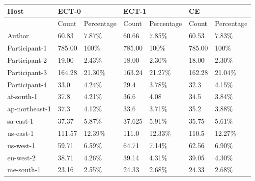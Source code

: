 \documentclass{l4proj}
\begin{document}
\begin{table}[H]
\begin{tabular}{|l|l|l|l|l|l|l|}
\hline
Host           & \multicolumn{2}{l|}{ECT-0} & \multicolumn{2}{l|}{ECT-1} & \multicolumn{2}{l|}{CE} \\ \hline
               & Count      & Percentage    & Count      & Percentage    & Count    & Percentage   \\ \hline
Author         & 60.83      & 7.87\%        & 60.66      & 7.85\%        & 60.53    & 7.83\%       \\ \hline
Participant-1  & 785.00     & 100\%         & 785.00     & 100\%         & 785.00   & 100\%        \\ \hline
Participant-2  & 19.00      & 2.43\%        & 18.00      & 2.30\%        & 18.00    & 2.30\%       \\ \hline
Participant-3  & 164.28     & 21.30\%        & 163.24     & 21.27\%  & 162.28   &   21.04\%          \\ \hline
Participant-4  & 33.0       & 4.24\%    & 29.4       &  3.78\%     & 32.3     &    4.15\%          \\ \hline
af-south-1     & 37.8       & 4.21\%              & 36.6       &  4.08             & 34.5     & 3.84\%             \\ \hline
ap-northeast-1 & 37.3       & 4.12\%              & 33.6       &   3.71\%            & 35.2     &  3.88\%            \\ \hline
sa-east-1      & 37.37      &  5.87\%             & 37.625     &  5.91\%             & 35.75    & 5.61\%             \\ \hline
us-east-1      & 111.57     & 12.39\%              & 111.0      &  12.33\%             & 110.5    &  12.27\%            \\ \hline
us-west-1      & 59.71      &  6.59\%             & 64.71      &    7.14\%           & 62.56    & 6.90\%             \\ \hline
eu-west-2      & 38.71      &  4.26\%             & 39.14      &   4.31\%            & 39.05    &   4.30\%           \\ \hline
me-south-1     & 23.16      &  2.55\%             & 24.33      &    2.68\%           & 24.33    & 2.68\%              \\ \hline
\end{tabular}
\end{table}
\end{document}
